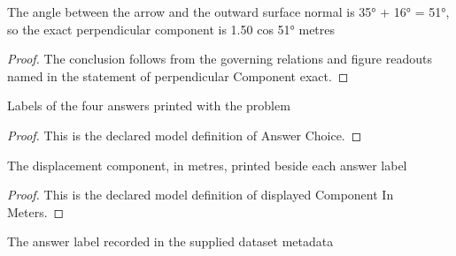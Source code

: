\begin{lemma}
  \label{lem:physics:phyx-mini-0678:phyxminiproblems-problemphyxmini0678-perpendicularcomponent-exact}
  The angle between the arrow and the outward surface normal is 35° + 16° = 51°, so the exact perpendicular component is 1.50 cos 51° metres
\end{lemma}
\begin{proof}
  The conclusion follows from the governing relations and figure readouts named in the statement of perpendicular Component exact.
\end{proof}
\begin{definition}
  \label{def:physics:phyx-mini-0678:phyxminiproblems-problemphyxmini0678-answerchoice}
  Labels of the four answers printed with the problem
\end{definition}
\begin{proof}
  This is the declared model definition of Answer Choice.
\end{proof}
\begin{definition}
  \label{def:physics:phyx-mini-0678:phyxminiproblems-problemphyxmini0678-displayedcomponentinmeters}
  The displacement component, in metres, printed beside each answer label
\end{definition}
\begin{proof}
  This is the declared model definition of displayed Component In Meters.
\end{proof}
\begin{definition}
  \label{def:physics:phyx-mini-0678:phyxminiproblems-problemphyxmini0678-recordedanswerchoice}
  The answer label recorded in the supplied dataset metadata
\end{definition}
